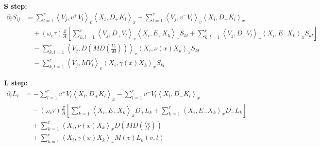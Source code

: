 \documentclass{article}
\begin{document}
\textbf{S step:}
\begin{align*}
    \partial_t S_{ij} &= \sum_{l=1}^r \left\langle V_j, v^+ V_l \right\rangle_v \left\langle X_i, D_+ K_l \right\rangle_x + \sum_{l=1}^r \left\langle V_j, v^- V_l \right\rangle_v \left\langle X_i, D_- K_l \right\rangle_x \\
                      &\quad + (\omega_c \tau) \frac{Z}{A} \left[ \sum_{k,l=1}^r \left\langle V_j, D_+ V_l \right\rangle_v \left\langle X_i, E_+ X_k \right\rangle_x S_{kl} + \sum_{k,l=1}^r \left\langle V_j, D_- V_l \right\rangle_v \left\langle X_i, E_- X_k \right\rangle_x S_{kl} \right] \\
                      &\quad - \sum_{k,l=1}^r \left\langle V_j, D \left( M D \left( \frac{V_l}{M} \right) \right) \right\rangle_v \left\langle X_i, \nu(x) X_k \right\rangle_x S_{kl} \\
                      &\quad - \sum_{k,l=1}^r \left\langle V_j, M V_l \right\rangle_v \left\langle X_i, \gamma(x) X_k \right\rangle_x S_{kl}
\end{align*}

\textbf{L step:}
\begin{align*}
    \partial_t L_i &= -\sum_{l=1}^r v^+ V_l \left\langle X_i, D_+ K_l \right\rangle_x - \sum_{l=1}^r v^- V_l \left\langle X_i, D_- K_l \right\rangle_x \\
                   &\quad - (\omega_c \tau) \frac{Z}{A} \left[ \sum_{k=1}^r \left\langle X_i, E_+ X_k \right\rangle_x D_+ L_k + \sum_{k=1}^r \left\langle X_i, E_- X_k \right\rangle_x D_- L_k  \right] \\
                   &\quad + \sum_{k=1}^r \left\langle X_i, \nu(x) X_k \right\rangle_x D \left( M D \left( \frac{L_k}{M} \right) \right) \\
                   &\quad + \sum_{k=1}^r \left\langle X_i, \gamma(x) X_k \right\rangle_x M(v) L_k(v, t) 
\end{align*}
\end{document}
